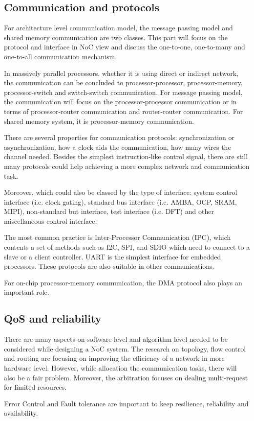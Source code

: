 \subsection{Communication and protocols}
\par For architecture level communication model, the message passing model and shared memory communication are two classes. This part will focus on the protocol and interface in NoC view and discuss the one-to-one, one-to-many and one-to-all communication mechanism.   
\par In massively parallel processors, whether it is using direct or indirect network, the communication can be concluded to processor-processor, processor-memory, processor-switch and switch-switch communication. For message passing model, the communication will focus on the processor-processor communication or in terms of processor-router communication and router-router communication. For shared memory system, it is processor-memory communication. 
\par There are several properties for communication protocols: synchronization or asynchronization, how a clock aids the communication, how many wires the channel needed. Besides the simplest instruction-like control signal, there are still many protocols could help achieving a more complex network and communication task. 
\par Moreover, which could also be classed by the type of interface: system control interface (i.e. clock gating), standard bus interface (i.e. AMBA, OCP, SRAM, MIPI), non-standard but interface, test interface (i.e. DFT) and other miscellaneous control interface.
\par The most common practice is Inter-Processor Communication (IPC), which contents a set of methods such as I2C, SPI, and SDIO which need to connect to a slave or a client controller. UART is the simplest interface for embedded processors. These protocols are also suitable in other communications. 
\par For on-chip processor-memory communication, the DMA protocol also plays an important role. 
\subsection{QoS and reliability}
\par There are many aspects on software level and algorithm level needed to be considered while designing a NoC system. The research on topology, flow control and routing are focusing on improving the efficiency of a network in more hardware level. However, while allocation the communication tasks, there will also be a fair problem. Moreover, the arbitration focuses on dealing multi-request for limited resources. 
\par Error Control and Fault tolerance are important to keep resilience, reliability and availability.
